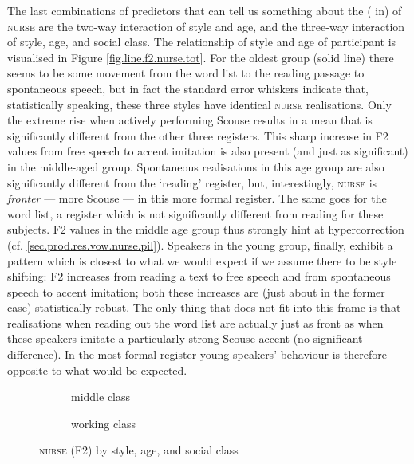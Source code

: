 The last combinations of predictors that can tell us something about the ( in)  of \textsc{nurse} are the two-way interaction of style and age, and the three-way interaction of style, age, and social class.
The relationship of style and age of participant is visualised in Figure \ref{fig.line.f2.nurse.tot}.
For the oldest group (solid line) there seems to be some movement from the word list to the reading passage to spontaneous speech, but in fact the standard error whiskers indicate that, statistically speaking, these three styles have identical \textsc{nurse} realisations.
Only the extreme rise when actively performing Scouse results in a mean that is significantly different from the other three registers.
This sharp increase in F2 values from free speech to accent imitation is also present (and just as significant) in the middle-aged group.
Spontaneous realisations in this age group are also significantly different from the `reading' register, but, interestingly, \textsc{nurse} is \emph{fronter} --- more Scouse --- in this more formal register.
The same goes for the word list, a register which is not significantly different from reading for these subjects.
F2 values in the middle age group thus strongly hint at hypercorrection (cf. \ref{sec.prod.res.vow.nurse.pil}).
Speakers in the young group, finally, exhibit a pattern which is closest to what we would expect if we assume there to be style shifting: F2 increases from reading a text to free speech and from spontaneous speech to accent imitation; both these increases are (just about in the former case) statistically robust.
The only thing that does not fit into this frame is that realisations when reading out the word list are actually just as front as when these speakers imitate a particularly strong Scouse accent (no significant difference).
In the most formal register young speakers' behaviour is therefore opposite to what would be expected.

\begin{figure}[h!]
	\centering
	\begin{subfigure}{.49\textwidth}
		\centering
			\resizebox{\linewidth}{!}{} 
		\caption{middle class}
		\label{fig.line.f2.nurse.mc}
	\end{subfigure}
	\begin{subfigure}{.49\textwidth}
		\centering
			\resizebox{\linewidth}{!}{} 
		\caption{working class}
		\label{fig.line.f2.nurse.wc}
	\end{subfigure}
	\caption{\textsc{nurse} (F2) by style, age, and social class}
\end{figure}

